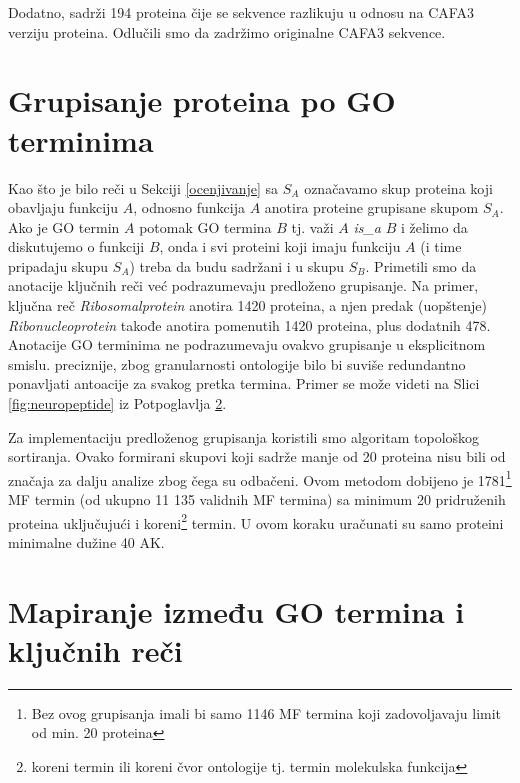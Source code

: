 Dodatno, \swissprot sadrži 194 proteina čije se sekvence razlikuju u
odnosu na CAFA3 verziju proteina. Odlučili smo da zadržimo originalne CAFA3
sekvence.

\section{Grupisanje proteina po GO terminima}
\label{grupisanje}

Kao što je bilo reči u Sekciji \ref{ocenjivanje} sa $S_A$ označavamo skup
proteina koji obavljaju funkciju $A$, odnosno funkcija $A$ anotira proteine
grupisane skupom $S_A$.  Ako je GO termin $A$ potomak GO termina $B$ tj. važi
$A$ \textit{is\_a} $B$ i želimo da diskutujemo o funkciji $B$, onda i svi
proteini koji imaju funkciju $A$ (i time pripadaju skupu $S_A$) treba da budu
sadržani i u skupu $S_B$.  Primetili smo da anotacije ključnih reči već
podrazumevaju predloženo grupisanje.  Na primer, ključna reč
\textit{Ribosomalprotein} anotira 1420 proteina, a njen predak (uopštenje)
\textit{Ribonucleoprotein} takođe anotira pomenutih 1420 proteina, plus
dodatnih 478.  Anotacije GO terminima ne podrazumevaju ovakvo grupisanje u
eksplicitnom smislu.  preciznije, zbog granularnosti ontologije bilo bi suviše
redundantno ponavljati antoacije za svakog pretka termina.  Primer se može
videti na Slici \ref{fig:neuropeptide} iz Potpoglavlja \ref{kw2go_mapiranje}.
 
Za implementaciju predloženog grupisanja koristili smo algoritam topološkog
sortiranja. Ovako formirani skupovi koji sadrže manje od 20 proteina nisu bili
od značaja za dalju analize zbog čega su odbačeni.
Ovom metodom dobijeno je 1781\footnote{Bez ovog grupisanja imali bi samo 1146
MF termina  koji zadovoljavaju limit od min.  20 proteina} MF termin (od ukupno
11 135 validnih MF termina) sa minimum 20 pridruženih proteina uključujući i
koreni\footnote{koreni termin ili koreni čvor ontologije tj.  termin molekulska
funkcija} termin. U ovom koraku uračunati su samo proteini minimalne dužine 40
AK.

\section{Mapiranje između GO termina i \swissprot ključnih reči}
\label{kw2go_mapiranje}

